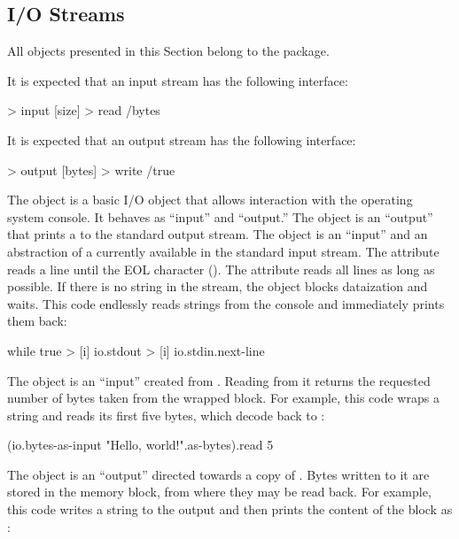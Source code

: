 
\subsection{I/O Streams}\label{sec:streams}

All objects presented in this Section belong to the  package.

It is expected that an input stream has the following interface:

\begin{ffcode}
[] > input
  [size] > read /bytes
\end{ffcode}

It is expected that an output stream has the following interface:

\begin{ffcode}
[] > output
  [bytes] > write /true
\end{ffcode}

The  object is a basic I/O object that allows interaction
  with the operating system console.
It behaves as ``input'' and ``output.''
%
The  object is an ``output'' that prints a  to the standard output stream.
%
The  object is an ``input'' and an abstraction of a 
  currently available in the standard input stream.
The attribute  reads a line until the EOL character ().
The attribute  reads all lines as long as possible.
If there is no string in the stream, the object blocks dataization and waits.
This code endlessly reads strings from the console and immediately prints them back:

\begin{ffcode}
while
  true > [i]
  io.stdout > [i]
    io.stdin.next-line
\end{ffcode}

The object  is an ``input'' created from .
Reading from it returns the requested number of bytes taken from the wrapped block.
For example, this code wraps a string and reads its first five bytes,
  which decode back to :

\begin{ffcode}
(io.bytes-as-input "Hello, world!".as-bytes).read 5
\end{ffcode}

The object  is an ``output'' directed towards a copy of .
Bytes written to it are stored in the memory block, from where they may be read back.
For example, this code writes a string to the output and then prints
  the content of the block as :

